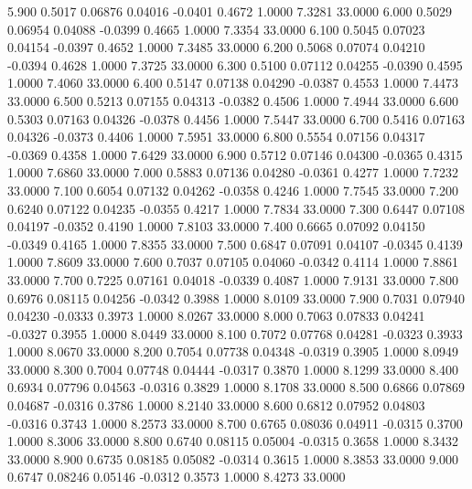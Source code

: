    5.900   0.5017   0.06876   0.04016  -0.0401   0.4672   1.0000   7.3281  33.0000
   6.000   0.5029   0.06954   0.04088  -0.0399   0.4665   1.0000   7.3354  33.0000
   6.100   0.5045   0.07023   0.04154  -0.0397   0.4652   1.0000   7.3485  33.0000
   6.200   0.5068   0.07074   0.04210  -0.0394   0.4628   1.0000   7.3725  33.0000
   6.300   0.5100   0.07112   0.04255  -0.0390   0.4595   1.0000   7.4060  33.0000
   6.400   0.5147   0.07138   0.04290  -0.0387   0.4553   1.0000   7.4473  33.0000
   6.500   0.5213   0.07155   0.04313  -0.0382   0.4506   1.0000   7.4944  33.0000
   6.600   0.5303   0.07163   0.04326  -0.0378   0.4456   1.0000   7.5447  33.0000
   6.700   0.5416   0.07163   0.04326  -0.0373   0.4406   1.0000   7.5951  33.0000
   6.800   0.5554   0.07156   0.04317  -0.0369   0.4358   1.0000   7.6429  33.0000
   6.900   0.5712   0.07146   0.04300  -0.0365   0.4315   1.0000   7.6860  33.0000
   7.000   0.5883   0.07136   0.04280  -0.0361   0.4277   1.0000   7.7232  33.0000
   7.100   0.6054   0.07132   0.04262  -0.0358   0.4246   1.0000   7.7545  33.0000
   7.200   0.6240   0.07122   0.04235  -0.0355   0.4217   1.0000   7.7834  33.0000
   7.300   0.6447   0.07108   0.04197  -0.0352   0.4190   1.0000   7.8103  33.0000
   7.400   0.6665   0.07092   0.04150  -0.0349   0.4165   1.0000   7.8355  33.0000
   7.500   0.6847   0.07091   0.04107  -0.0345   0.4139   1.0000   7.8609  33.0000
   7.600   0.7037   0.07105   0.04060  -0.0342   0.4114   1.0000   7.8861  33.0000
   7.700   0.7225   0.07161   0.04018  -0.0339   0.4087   1.0000   7.9131  33.0000
   7.800   0.6976   0.08115   0.04256  -0.0342   0.3988   1.0000   8.0109  33.0000
   7.900   0.7031   0.07940   0.04230  -0.0333   0.3973   1.0000   8.0267  33.0000
   8.000   0.7063   0.07833   0.04241  -0.0327   0.3955   1.0000   8.0449  33.0000
   8.100   0.7072   0.07768   0.04281  -0.0323   0.3933   1.0000   8.0670  33.0000
   8.200   0.7054   0.07738   0.04348  -0.0319   0.3905   1.0000   8.0949  33.0000
   8.300   0.7004   0.07748   0.04444  -0.0317   0.3870   1.0000   8.1299  33.0000
   8.400   0.6934   0.07796   0.04563  -0.0316   0.3829   1.0000   8.1708  33.0000
   8.500   0.6866   0.07869   0.04687  -0.0316   0.3786   1.0000   8.2140  33.0000
   8.600   0.6812   0.07952   0.04803  -0.0316   0.3743   1.0000   8.2573  33.0000
   8.700   0.6765   0.08036   0.04911  -0.0315   0.3700   1.0000   8.3006  33.0000
   8.800   0.6740   0.08115   0.05004  -0.0315   0.3658   1.0000   8.3432  33.0000
   8.900   0.6735   0.08185   0.05082  -0.0314   0.3615   1.0000   8.3853  33.0000
   9.000   0.6747   0.08246   0.05146  -0.0312   0.3573   1.0000   8.4273  33.0000
